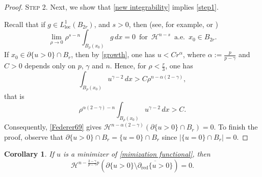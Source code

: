 \documentclass[11pt, reqno]{amsart}
\newtheorem{corollary}{Corollary}
\numberwithin{equation}{section}
\numberwithin{theorem}{section}
\numberwithin{lemma}{section}
\numberwithin{corollary}{section}
\numberwithin{remark}{section}
\numberwithin{proposition}{section}
\numberwithin{definition}{section}
\newcommand{\loc}{\operatorname{loc}}
\newcommand{\reduced}{\operatorname{red}}
\begin{document}
\begin{proof}
    \textsc{Step 2.} Next, we show that \eqref{new integrability} implies \eqref{step1}. 
    
    Recall that if $g\in L^1_{\loc}(B_{2r})$, and $s>0$, then (see, for example, \cite[2.10.19 (4)]{F69} or \cite[Theorem 5.8, see also Section 6.2]{M12})
    \begin{equation}\label{Federer69}
        \lim_{\rho\to0}\rho^{s-n}\int_{B_\rho(x_0)}g\,dx=0\,\,\,\text{for}\,\,\,\mathcal{H}^{n-s}\,\,\,\text{a.e.}\,\,\,x_0\in B_{2r}.
    \end{equation}
    If $x_0\in\partial\{u>0\}\cap B_r$, then by \eqref{growth}, one has $u<Cr^\alpha$, where $\alpha:=\frac{p}{p-\gamma}$ and $C>0$ depends only on $p$, $\gamma$ and $n$. Hence, for $\rho<\frac{r}{3}$, one has
    $$
    \int_{B_\rho(x_0)}u^{\gamma-2}\,dx>C\rho^{n-\alpha(2-\gamma)},
    $$
    that is
    $$
    \rho^{\alpha(2-\gamma)-n}\int_{B_\rho(x_0)}u^{\gamma-2}\,dx>C.
    $$
    Consequently, \eqref{Federer69} gives $\mathcal{H}^{n-\alpha(2-\gamma)}(\partial\{u>0\}\cap B_r)=0$. To finish the proof, observe that $\partial\{u>0\}\cap B_r=\{u=0\}\cap B_r$ since $|\{u=0\}\cap B_r|=0$. 
\end{proof}
\begin{corollary}\label{n-2 Hausdorff}
    If $u$ is a minimizer of \eqref{mimization functional}, then 
    $$
    \mathcal{H}^{n-\frac{2-\gamma}{p-\gamma}p}\left(\partial\{u>0\}\setminus\overline{\partial_{\reduced}\{u>0\}}\right)=0.
    $$
\end{corollary}
\end{document}
